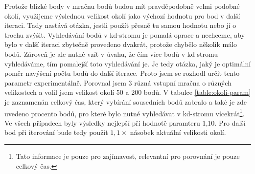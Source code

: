 \documentclass[11pt,twoside,a4paper]{book}
\begin{document}
Protože blízké body v mračnu bodů budou mít pravděpodobně velmi podobné okolí, využijeme výslednou velikost okolí jako výchozí hodnotu pro bod v další iteraci. Tady nastává otázka, jestli použít přesně tu samou hodnotu nebo jí o trochu zvýšit. Vyhledávání bodů v kd-stromu je pomalá oprace a nechceme, aby bylo v další iteraci zbytečně provedeno dvakrát, protože chybělo několik málo bodů. Zároveň je ale nutné vzít v úvahu, že čím více bodů v kd-stromu vyhledáváme, tím pomalejší toto vyhledávání je. Je tedy otázka, jaký je optimální poměr navýšení počtu bodů do další iterace. Proto jsem se rozhodl určit tento parametr experimentálně. Porovnal jsem 3 různá vstupní mračna o různých velikostech a volil jsem velikost okolí 50 a 200 bodů. V tabulce \ref{table:okoli-param} je zaznamenán celkový čas, který vybírání sousedních bodů zabralo a také je zde uvedeno procento bodů, pro které bylo nutné vyhledávat v kd-stromu vícekrát\footnote{Tato informace je pouze pro zajímavost, relevantní pro porovnání je pouze celkový čas.}. Ve všech případech byly výsledky nejlepší při hodnotě paramteru 1,10. Pro další bod při iterování bude tedy použit $1,1\times$ násobek aktuální velikosti okolí.
\end{document}
